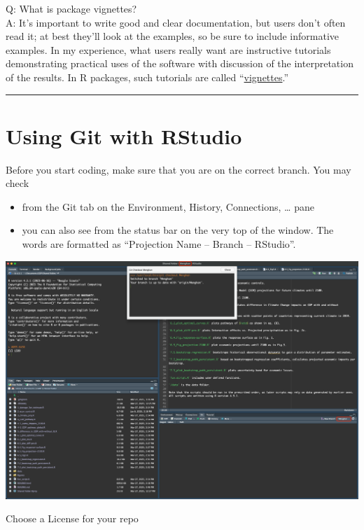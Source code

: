 \documentclass[
  a4paper,
  twoside,
  openright]{book}
\providecommand{\tightlist}{%
  \setlength{\itemsep}{0pt}\setlength{\parskip}{0pt}}
\theoremstyle{definition}
\theoremstyle{definition}
\theoremstyle{definition}
\theoremstyle{definition}
\theoremstyle{remark}
\begin{document}
Q: What is package vignettes?\\
A: It's important to write good and clear documentation, but users don't often read it; at best they'll look at the examples, so be sure to include informative examples. In my experience, what users really want are instructive tutorials demonstrating practical uses of the software with discussion of the interpretation of the results. In R packages, such tutorials are called ``\href{https://kbroman.org/pkg_primer/pages/vignettes.html}{vignettes}.''

\begin{center}\rule{0.5\linewidth}{0.5pt}\end{center}

\section{Using Git with RStudio}\label{using-git-with-rstudio}

Before you start coding, make sure that you are on the correct branch. You may check

\begin{itemize}
\tightlist
\item
  from the Git tab on the Environment, History, Connections, \ldots{} pane
\item
  you can also see from the status bar on the very top of the window. The words are formatted as ``Projection Name -- Branch -- RStudio''.
\end{itemize}

\includegraphics[width=1\linewidth]{images/R git branch}

Choose a License for your repo
\end{document}
